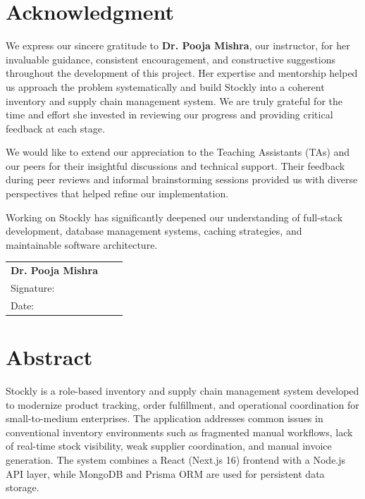 \documentclass[12pt,onecolumn]{IEEEtran}
\let\oldsection\section
\renewcommand{\section}{\clearpage\oldsection}
\begin{document}
\section*{Acknowledgment}
We express our sincere gratitude to \textbf{Dr. Pooja Mishra}, our instructor, for her invaluable guidance, consistent encouragement, and constructive suggestions throughout the development of this project. Her expertise and mentorship helped us approach the problem systematically and build Stockly into a coherent inventory and supply chain management system. We are truly grateful for the time and effort she invested in reviewing our progress and providing critical feedback at each stage.

We would like to extend our appreciation to the Teaching Assistants (TAs) and our peers for their insightful discussions and technical support. Their feedback during peer reviews and informal brainstorming sessions provided us with diverse perspectives that helped refine our implementation.

Working on Stockly has significantly deepened our understanding of full-stack development, database management systems, caching strategies, and maintainable software architecture.

\vspace{2.2cm}
\noindent
\begin{tabular}{p{6cm}p{1cm}p{6cm}}
    \textbf{Dr. Pooja Mishra} \\[0.2cm]
    Signature: \underline{\hspace{4cm}}
    \\
    Date: \underline{\hspace{4.4cm}} \\
\end{tabular}

\section*{Abstract}
Stockly is a role-based inventory and supply chain management system developed to modernize product tracking, order fulfillment, and operational coordination for small-to-medium enterprises. The application addresses common issues in conventional inventory environments such as fragmented manual workflows, lack of real-time stock visibility, weak supplier coordination, and manual invoice generation. The system combines a React (Next.js 16) frontend with a Node.js API layer, while MongoDB and Prisma ORM are used for persistent data storage.
\end{document}
